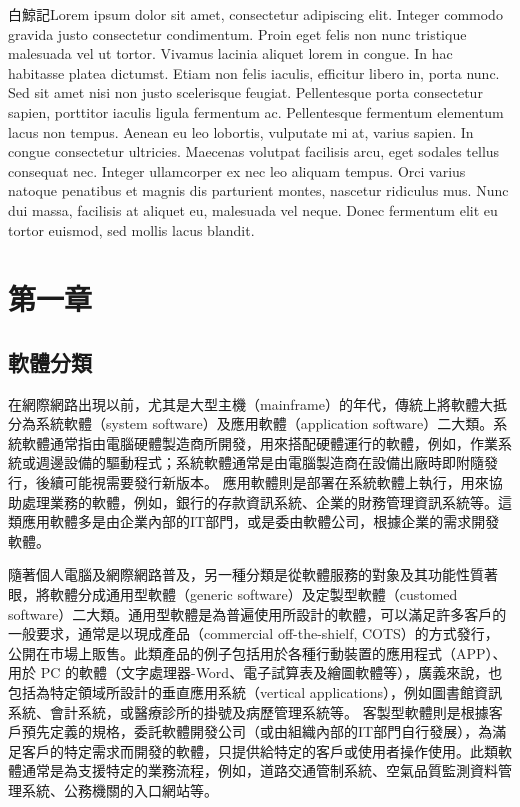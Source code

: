 \documentclass[
  letterpaper,
  oneside,
  open=any]{scrbook}
\begin{document}
白鯨記Lorem ipsum dolor sit amet, consectetur adipiscing elit. Integer
commodo gravida justo consectetur condimentum. Proin eget felis non nunc
tristique malesuada vel ut tortor. Vivamus lacinia aliquet lorem in
congue. In hac habitasse platea dictumst. Etiam non felis iaculis,
efficitur libero in, porta nunc. Sed sit amet nisi non justo scelerisque
feugiat. Pellentesque porta consectetur sapien, porttitor iaculis ligula
fermentum ac. Pellentesque fermentum elementum lacus non tempus. Aenean
eu leo lobortis, vulputate mi at, varius sapien. In congue consectetur
ultricies. Maecenas volutpat facilisis arcu, eget sodales tellus
consequat nec. Integer ullamcorper ex nec leo aliquam tempus. Orci
varius natoque penatibus et magnis dis parturient montes, nascetur
ridiculus mus. Nunc dui massa, facilisis at aliquet eu, malesuada vel
neque. Donec fermentum elit eu tortor euismod, sed mollis lacus blandit.


\chapter{第一章}\label{ux7b2cux4e00ux7ae0}

\section{軟體分類}\label{ux8edfux9ad4ux5206ux985e}

在網際網路出現以前，尤其是大型主機（mainframe）的年代，傳統上將軟體大抵分為系統軟體（system
software）及應用軟體（application
software）二大類。系統軟體通常指由電腦硬體製造商所開發，用來搭配硬體運行的軟體，例如，作業系統或週邊設備的驅動程式；系統軟體通常是由電腦製造商在設備出廠時即附隨發行，後續可能視需要發行新版本。
應用軟體則是部署在系統軟體上執行，用來協助處理業務的軟體，例如，銀行的存款資訊系統、企業的財務管理資訊系統等。這類應用軟體多是由企業內部的IT部門，或是委由軟體公司，根據企業的需求開發軟體。

隨著個人電腦及網際網路普及，另一種分類是從軟體服務的對象及其功能性質著眼，將軟體分成通用型軟體（generic
software）及定製型軟體（customed
software）二大類。通用型軟體是為普遍使用所設計的軟體，可以滿足許多客戶的一般要求，通常是以現成產品（commercial
off-the-shielf,
COTS）的方式發行，公開在市場上販售。此類產品的例子包括用於各種行動裝置的應用程式（APP）、用於
PC
的軟體（文字處理器-Word、電子試算表及繪圖軟體等），廣義來說，也包括為特定領域所設計的垂直應用系統（vertical
applications），例如圖書館資訊系統、會計系統，或醫療診所的掛號及病歷管理系統等。
客製型軟體則是根據客戶預先定義的規格，委託軟體開發公司（或由組織內部的IT部門自行發展），為滿足客戶的特定需求而開發的軟體，只提供給特定的客戶或使用者操作使用。此類軟體通常是為支援特定的業務流程，例如，道路交通管制系統、空氣品質監測資料管理系統、公務機關的入口網站等。
\end{document}
